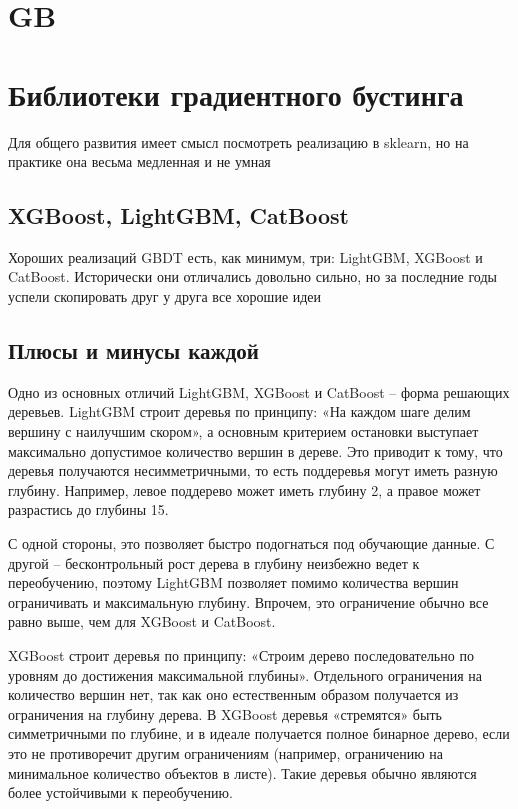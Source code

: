 \documentclass[a4paper, 14pt]{article}
\begin{document}
    \section{GB}
    
    
    \section{Библиотеки градиентного бустинга}
    
    Для общего развития имеет смысл посмотреть реализацию в sklearn, но на практике она весьма медленная и не умная
    
    \subsection{XGBoost, LightGBM, CatBoost}
    
    Хороших реализаций GBDT есть, как минимум, три: LightGBM, XGBoost и CatBoost.
    Исторически они отличались довольно сильно, но за последние годы успели скопировать друг у друга все хорошие идеи
    
    \subsection{Плюсы и минусы каждой}
    
    Одно из основных отличий LightGBM, XGBoost и CatBoost -- форма решающих деревьев.
    LightGBM строит деревья по принципу: «На каждом шаге делим вершину с наилучшим скором», а основным критерием
    остановки выступает максимально допустимое количество вершин в дереве.
    Это приводит к тому, что деревья получаются несимметричными, то есть поддеревья могут иметь разную глубину.
    Например, левое поддерево может иметь глубину 2, а правое может разрастись до глубины 15.
    
    С одной стороны, это позволяет быстро подогнаться под обучающие данные.
    С другой -- бесконтрольный рост дерева в глубину неизбежно ведет к переобучению, поэтому LightGBM позволяет помимо
    количества вершин ограничивать и максимальную глубину.
    Впрочем, это ограничение обычно все равно выше, чем для XGBoost и CatBoost.
    
    XGBoost строит деревья по принципу: «Строим дерево последовательно по уровням до достижения максимальной глубины».
    Отдельного ограничения на количество вершин нет, так как оно естественным образом получается из ограничения на
    глубину дерева.
    В XGBoost деревья «стремятся» быть симметричными по глубине, и в идеале получается полное бинарное дерево, если это
    не противоречит другим ограничениям (например, ограничению на минимальное количество объектов в листе).
    Такие деревья обычно являются более устойчивыми к переобучению.
    
\end{document}
